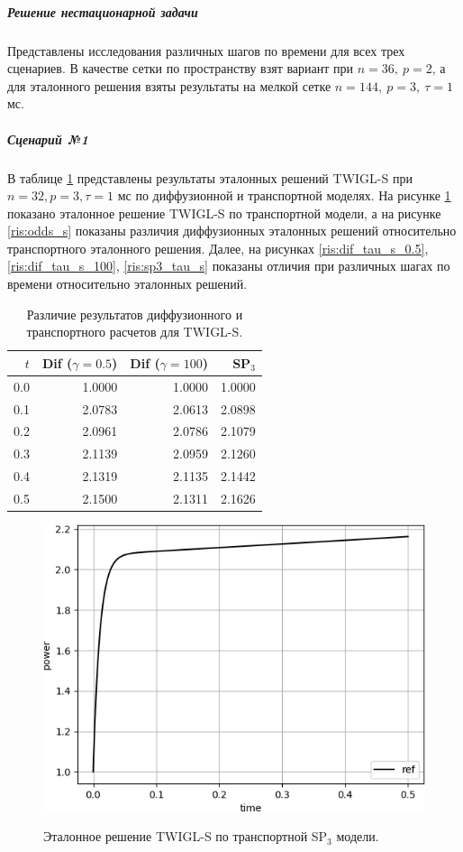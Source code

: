 \documentclass{crm-article}
\begin{document}
\subparagraph{Решение нестационарной задачи}
Представлены исследования различных шагов по времени для всех трех сценариев.  В качестве сетки по пространству взят вариант при $n=36,\ p=2$, а для эталонного решения взяты результаты на мелкой сетке $n=144,\ p=3,\ \tau=1$ мс.

\subparagraph{Сценарий №1}
В таблице \ref{table:twigl-s} представлены результаты эталонных решений TWIGL-S при $n=32, p=3, \tau=1$ мс по диффузионной и транспортной моделях.
На рисунке \ref{ris:sp3_ref_s} показано эталонное решение TWIGL-S по транспортной модели, а на рисунке \ref{ris:odds_s} показаны различия диффузионных эталонных решений относительно транспортного эталонного решения. 
Далее, на рисунках \ref{ris:dif_tau_s_0.5}, \ref{ris:dif_tau_s_100}, \ref{ris:sp3_tau_s} показаны отличия при различных шагах по времени относительно эталонных решений.

\begin{table}[ht]
\caption{Различие результатов диффузионного и транспортного расчетов для TWIGL-S.}
\label{table:twigl-s}
\begin{center}
\begin{tabular}{r r r r}
\hline
$t$ & Dif ($\gamma=0.5$) & Dif ($\gamma=100$) & SP$_3$\\
\hline
0.0 & 1.0000 & 1.0000 & 1.0000\\
0.1 & 2.0783  & 2.0613 & 2.0898\\
0.2 & 2.0961 & 2.0786 & 2.1079\\
0.3 & 2.1139 & 2.0959 & 2.1260\\
0.4 & 2.1319 & 2.1135 & 2.1442\\
0.5 & 2.1500 & 2.1311 & 2.1626\\
\hline
\end{tabular}
\end{center}
\end{table}

\begin{figure}[ht]
\begin{center}
	\includegraphics[width=0.5\linewidth]{sp3_ref_s.png}\\
	\caption{\label{image:canonsummary} Эталонное решение TWIGL-S по транспортной SP$_3$ модели.}
	\label{ris:sp3_ref_s}
\end{center}
\end{figure}
\end{document}
